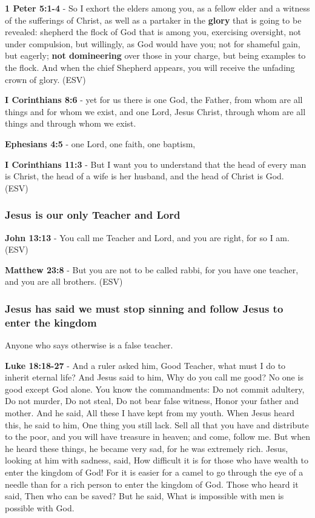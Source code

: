 \documentclass[11pt]{article}
\begin{document}
\textbf{1 Peter 5:1-4} - So I exhort the elders among you, as a fellow elder and a witness of the sufferings of Christ, as well as a partaker in the \textbf{glory} that is going to be revealed: shepherd the flock of God that is among you, exercising oversight, not under compulsion, but willingly, as God would have you; not for shameful gain, but eagerly; \textbf{not domineering} over those in your charge, but being examples to the flock. And when the chief Shepherd appears, you will receive the unfading crown of glory. (ESV)

\textbf{I Corinthians 8:6} - yet for us there is one God, the Father, from whom are all things and for whom we exist, and one Lord, Jesus Christ, through whom are all things and through whom we exist.

\textbf{Ephesians 4:5} - one Lord, one faith, one baptism,

\textbf{I Corinthians 11:3} - But I want you to understand that the head of every man is Christ, the head of a wife is her husband, and the head of Christ is God. (ESV)

\subsubsection{Jesus is our only Teacher and Lord}
\label{sec:orgb9d411b}
\textbf{John 13:13} - You call me Teacher and Lord, and you are right, for so I am. (ESV)

\textbf{Matthew 23:8} - But you are not to be called rabbi, for you have one teacher, and you are all brothers. (ESV)

\subsubsection{Jesus has said we must stop sinning and follow Jesus to enter the kingdom}
\label{sec:org56f50ec}
Anyone who says otherwise is a false teacher.

\textbf{Luke 18:18-27} - And a ruler asked him, Good Teacher, what must I do to inherit eternal life? And Jesus said to him, Why do you call me good? No one is good except God alone. You know the commandments: Do not commit adultery, Do not murder, Do not steal, Do not bear false witness, Honor your father and mother. And he said, All these I have kept from my youth. When Jesus heard this, he said to him, One thing you still lack. Sell all that you have and distribute to the poor, and you will have treasure in heaven; and come, follow me. But when he heard these things, he became very sad, for he was extremely rich. Jesus, looking at him with sadness, said, How difficult it is for those who have wealth to enter the kingdom of God! For it is easier for a camel to go through the eye of a needle than for a rich person to enter the kingdom of God. Those who heard it said, Then who can be saved? But he said, What is impossible with men is possible with God.
\end{document}
